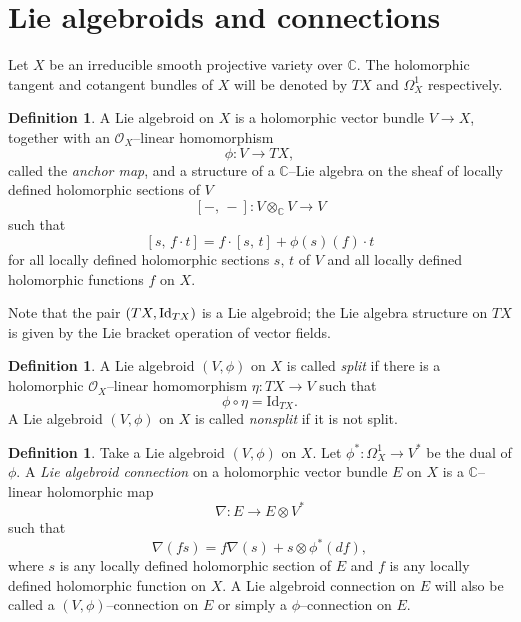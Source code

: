 \documentclass[12pt,reqno]{amsart}
\numberwithin{equation}{section}
\theoremstyle{definition}
\newtheorem{definition}[theorem]{Definition}
\begin{document}
\section{Lie algebroids and connections}

Let $X$ be an irreducible smooth projective variety over $\mathbb{C}$. The holomorphic tangent and
cotangent bundles of $X$ will be denoted by $TX$ and $\Omega^1_X$ respectively.

\begin{definition}\label{Def-1}
A Lie algebroid on $X$ is a holomorphic vector bundle $V \longrightarrow X$,
together with an ${\mathcal{O}}_X$--linear homomorphism $$\phi : V  \longrightarrow TX,$$ called the {\it anchor
map}, and a structure of a $\mathbb{C}$--Lie algebra on the sheaf of locally defined holomorphic sections of $V$
$$
[-, \,-]  : V \otimes_{\mathbb{C}} V  \longrightarrow V
$$
such that $$[s,\, f\cdot t]  =  f \cdot [s,\, t]+\phi(s)(f) \cdot t$$ for all locally defined
holomorphic sections $s,\, t$ of $V$ and all locally defined holomorphic functions $f$ on $X$.
\end{definition}

Note that the pair $(TX,  {\rm Id}_{TX})$ is a Lie algebroid; the Lie algebra structure on
$TX$ is given by the Lie bracket operation of vector fields.

\begin{definition}
\label{Def-2}
A Lie algebroid $(V, \phi)$ on $X$ is called \textit{split} if there is a holomorphic
${\mathcal O}_X$--linear homomorphism $\eta : TX \longrightarrow V$ such that
\begin{equation}\label{eta}
\phi\circ\eta  =  \text{Id}_{TX}.
\end{equation}
A Lie algebroid $(V, \phi)$ on $X$ is called \textit{nonsplit} if it is not split.
\end{definition}

\begin{definition}
\label{Def-3}
Take a Lie algebroid $(V, \phi)$ on $X$.
Let $\phi^*: \Omega^1_X  \longrightarrow V^*$ be the dual of $\phi$.
A \emph{Lie algebroid connection} on a holomorphic vector bundle $E$ on $X$ 
is a $\mathbb{C}$--linear holomorphic map 
$$
\nabla : E \longrightarrow E \otimes V^*
$$
such that $$\nabla (fs) = f \nabla (s) + s\otimes \phi^*(df), $$ where $s$ is any locally
defined holomorphic section of $E$ and $f$ is any locally defined
holomorphic function on $X$. A Lie algebroid connection on $E$ will also be called a $(V, \phi)$--connection on $E$ or simply
a $\phi$--connection on $E$.
\end{definition}
\end{document}
